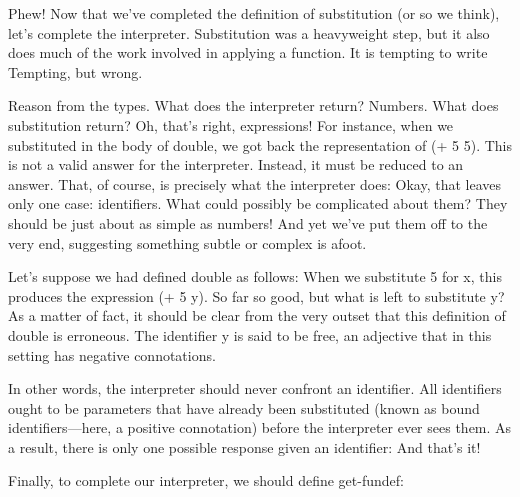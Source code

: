 \label{interpresumed}

Phew! Now that we’ve completed the definition of substitution (or so we think),
let’s complete the interpreter. Substitution was a heavyweight step, but it also
does much of the work involved in applying a function. It is tempting to write
Tempting, but wrong.


Reason from the types. What does the interpreter return? Numbers. What does
substitution return? Oh, that’s right, expressions! For instance, when we
substituted in the body of double, we got back the representation of (+ 5 5).
This is not a valid answer for the interpreter. Instead, it must be reduced to
an answer. That, of course, is precisely what the interpreter does:
Okay, that leaves only one case: identifiers. What could possibly be complicated
about them? They should be just about as simple as numbers! And yet we’ve put
them off to the very end, suggesting something subtle or complex is afoot.


Let’s suppose we had defined double as follows:
When we substitute 5 for x, this produces the expression (+ 5 y). So far so
good, but what is left to substitute y? As a matter of fact, it should be clear
from the very outset that this definition of double is erroneous. The identifier
y is said to be free, an adjective that in this setting has negative
connotations.

In other words, the interpreter should never confront an identifier. All
identifiers ought to be parameters that have already been substituted (known as
bound identifiers—here, a positive connotation) before the interpreter ever sees
them. As a result, there is only one possible response given an identifier:
And that’s it!

Finally, to complete our interpreter, we should define get-fundef:
